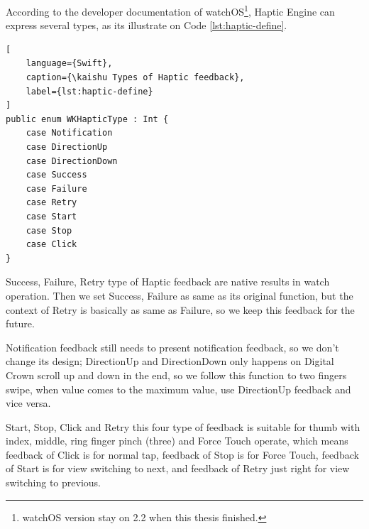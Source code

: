 According to the developer documentation of watchOS\footnote{watchOS version stay on 2.2 when this thesis finished.}, Haptic Engine can express several types, as its illustrate on Code \ref{lst:haptic-define}.

\begin{lstlisting}[
    language={Swift},
    caption={\kaishu Types of Haptic feedback},
    label={lst:haptic-define}
]
public enum WKHapticType : Int {
    case Notification
    case DirectionUp
    case DirectionDown
    case Success
    case Failure
    case Retry
    case Start
    case Stop
    case Click
}
\end{lstlisting}


Success, Failure, Retry type of Haptic feedback are native results in watch operation.
Then we set Success, Failure as same as its original function, but the context of Retry is basically as same as Failure, so we keep this feedback for the future.


Notification feedback still needs to present notification feedback, so we don't change its design; DirectionUp and DirectionDown only happens on Digital Crown scroll up and down in the end, so we follow this function to two fingers swipe, when value comes to the maximum value, use DirectionUp feedback and  vice versa.

Start, Stop, Click and Retry this four type of feedback is suitable for thumb with index, middle, ring finger pinch (three) and Force Touch operate, which means feedback of Click is for normal tap, feedback of Stop is for Force Touch, feedback of Start is for view switching to next, and feedback of Retry just right for view switching to previous.

